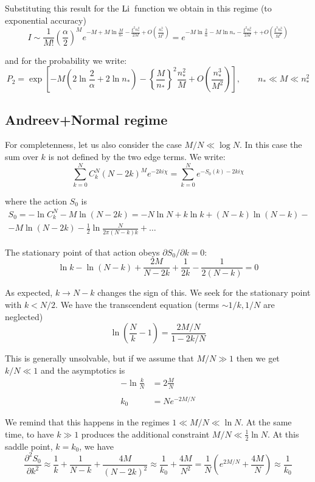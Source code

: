 Substituting this result for the $\mathrm{Li}\,$ function we obtain in this
regime (to exponential accuracy)
\[
I\sim\frac{1}{M!}(\frac{\alpha}{2})^{M}e^{-M+M\ln\frac{M}{n_{*}}-\frac{\xi^{2}n_{*}^{2}}{2M}+O\left(\frac{n_{*}^{3}}{M^{2}}\right)}=e^{-M\ln\frac{2}{\alpha}-M\ln n_{*}-\frac{\xi^{2}n_{*}^{2}}{2M}++O\left(\frac{\xi^{3}n_{*}^{3}}{M^{2}}\right)}
\]

and for the probability we write:
\[
P_{2}=\exp\left[-M\left(2\ln\frac{2}{\alpha}+2\ln n_{*}\right)-\left\{ \frac{M}{n_{*}}\right\} ^{2}\frac{n_{*}^{2}}{M}+O\left(\frac{n_{*}^{3}}{M^{2}}\right)\right],\qquad n_{*}\ll M\ll n_{*}^{2}
\]

\subsection{Andreev+Normal regime}

For completenness, let us also consider the case $M/N\ll\log N$.
In this case the sum over $k$ is not defined by the two edge terms.
We write:
\[
\sum_{k=0}^{N}C_{k}^{N}(N-2k)^{M}e^{-2ki\chi}=\sum_{k=0}^{N}e^{-S_{0}(k)-2ki\chi}
\]

where the action $S_{0}$ is 
\begin{multline*}
S_{0}=-\ln C_{k}^{N}-M\ln(N-2k)=-N\ln N+k\ln k+(N-k)\ln(N-k)-\\
-M\ln(N-2k)-\frac{1}{2}\ln\frac{N}{2\pi(N-k)k}+\dots
\end{multline*}

The stationary point of that action obeys $\partial S_{0}/\partial k=0$:
\[
\ln k-\ln(N-k)+\frac{2M}{N-2k}+\frac{1}{2k}-\frac{1}{2(N-k)}=0
\]

As expected, $k\to N-k$ changes the sign of this. We seek for the
stationary point with $k<N/2$. We have the transcendent equation
(terms $\sim1/k,1/N$ are neglected)
\[
\ln(\frac{N}{k}-1)=\frac{2M/N}{1-2k/N}
\]

This is generally unsolvable, but if we assume that $M/N\gg1$ then
we get $k/N\ll1$ and the asymptotics is
\begin{align*}
-\ln\frac{k}{N} & =2\frac{M}{N}\\
\\
k_{0} & =Ne^{-2M/N}
\end{align*}

We remind that this happens in the regimes $1\ll M/N\ll\ln N$. At
the same time, to have $k\gg1$ produces the additional constraint
$M/N\ll\frac{1}{2}\ln N$. At this saddle point, $k=k_{0}$, we have
\[
\frac{\partial^{2}S_{0}}{\partial k^{2}}\approx\frac{1}{k}+\frac{1}{N-k}+\frac{4M}{(N-2k)^{2}}\approx\frac{1}{k_{0}}+\frac{4M}{N^{2}}=\frac{1}{N}\left(e^{2M/N}+\frac{4M}{N}\right)\approx\frac{1}{k_{0}}
\]

